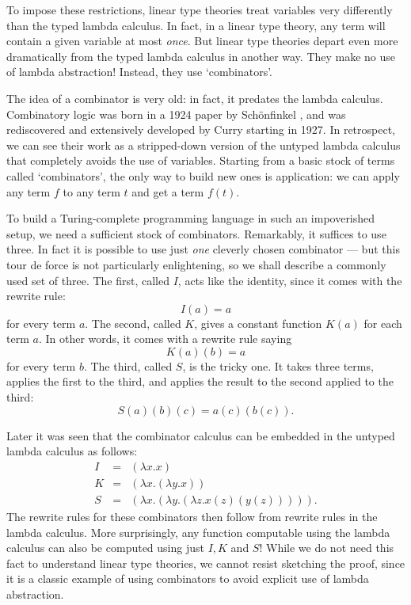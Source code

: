 \documentclass[12pt]{article}
\begin{document}
To impose these restrictions, linear type theories treat variables
very differently than the typed lambda calculus.  In fact, in a linear
type theory, any term will contain a given variable at most {\it
once}.  But linear type theories depart even more dramatically from
the typed lambda calculus in another way.  They make no use of lambda
abstraction!  Instead, they use `combinators'.

The idea of a combinator is very old: in fact, it predates the lambda
calculus.  Combinatory logic was born in a 1924 paper by Sch\"onfinkel
\cite{Schoenfinkel}, and was rediscovered and extensively developed
by Curry \cite{Curry} starting in 1927.  In retrospect, we can see
their work as a stripped-down version of the untyped lambda calculus
that completely avoids the use of variables.  Starting from a basic
stock of terms called `combinators', the only way to build new ones is
application: we can apply any term $f$ to any term $t$ and get a term
$f(t)$.

To build a Turing-complete programming language in such an impoverished
setup, we need a sufficient stock of combinators.  Remarkably, it
suffices to use three.  In fact it is possible to use just {\it one}
cleverly chosen combinator --- but this tour de force is not
particularly enlightening, so we shall describe a commonly used set of
three.  The first, called $I$, acts like the identity, since it comes
with the rewrite rule:
\[     I(a) = a  \]
for every term $a$.  The second, called $K$, gives a constant function
$K(a)$ for each term $a$.  In other words, it comes with a rewrite
rule saying
\[   K(a)(b) = a  \]
for every term $b$.  The third, called $S$, is the tricky one.  It
takes three terms, applies the first to the third, and applies the
result to the second applied to the third:
\[   S(a)(b)(c) = a(c)(b(c)).  \]

Later it was seen that the combinator calculus can be embedded in
the untyped lambda calculus as follows:
\[
\begin{array}{ccl}
  I &=& (\lambda x . x)  \\
  K &=& (\lambda x . (\lambda y . x)) \\
  S &=& (\lambda x . (\lambda y . (\lambda z . x(z)(y(z)) ))) .
\end{array}
\]
The rewrite rules for these combinators then follow from rewrite rules
in the lambda calculus.  More surprisingly, any function computable
using the lambda calculus can also be computed using just $I, K$ and
$S$!  While we do not need this fact to understand linear type
theories, we cannot resist sketching the proof, since it is a classic
example of using combinators to avoid explicit use of lambda
abstraction.
\end{document}
